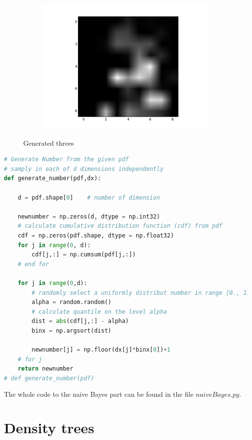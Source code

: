 \documentclass{article}
\begin{document}
\begin{figure}[ht]
\begin{subfigure}[b]{0.5\textwidth}
                \includegraphics[width=\textwidth]{../new3nB_3.png}
        \end{subfigure}        
        \caption{Generated threes}
\end{figure}

\FloatBarrier

\begin{lstlisting}[language=Python]
# Generate Number from the given pdf
# samply in each of d dimensions independently
def generate_number(pdf,dx):
    
    d = pdf.shape[0]    # number of dimension
    
    newnumber = np.zeros(d, dtype = np.int32)
    # calculate cumulative distribution function (cdf) from pdf
    cdf = np.zeros(pdf.shape, dtype = np.float32)
    for j in range(0, d):
        cdf[j,:] = np.cumsum(pdf[j,:])
    # end for
        
    for j in range(0,d):
        # randomly select a uniformly distribut number in range [0., 1.)
        alpha = random.random()
        # calculate quantile on the level alpha
        dist = abs(cdf[j,:] - alpha)
        binx = np.argsort(dist)
        
        newnumber[j] = np.floor(dx[j]*binx[0])+1
    # for j    
    return newnumber
# def generate_number(pdf)
\end{lstlisting}

The whole code to the naive Bayes part can be found in the file $naiveBayes.py$.

\section{Density trees}
\end{document}

